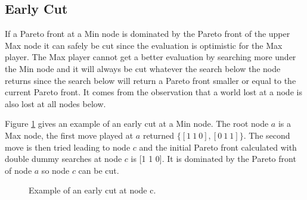 \documentclass{ecai}
\begin{document}
\subsection{Early Cut}



If a Pareto front at a Min node is dominated by the Pareto front of
the upper Max node it can safely be cut since the evaluation is
optimistic for the Max player. The Max player cannot get a better
evaluation by searching more under the Min node and it will always be
cut whatever the search below the node returns since the search below
will return a Pareto front smaller or equal to the current Pareto
front. It comes from the observation that a world lost at a node is
also lost at all nodes below.

Figure \ref{figureEarlyCut} gives an example of an early cut at a Min
node. The root node $a$ is a Max node, the first move played at $a$
returned $\{[1~1~0],[0~1~1]\}$. The second move is then tried leading
to node $c$ and the initial Pareto front calculated with double dummy
searches at node $c$ is [1 1 0]. It is dominated by the Pareto front
of node $a$ so node $c$ can be cut.

\begin{figure}
  \centering
  \caption{Example of an early cut at node c.}
  \label{figureEarlyCut}
\end{figure}
\end{document}
